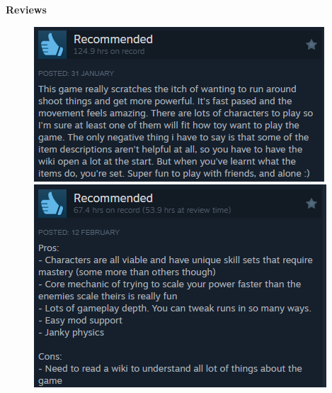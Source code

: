 \documentclass{article}
\newcommand{\smallBr}{\vspace{1.5mm}}
\begin{document}
\textbf{Reviews} \linebreak
\begin{figure}[h]
\centering
\begin{minipage}{0.4\linewidth}
\includegraphics[width =\linewidth]{ROR2 review 1}
\smallBr
\includegraphics[width =\linewidth]{ROR2 review 3}
\end{minipage}
\begin{minipage}{0.4\linewidth}

\end{minipage}
\end{figure}
\end{document}
